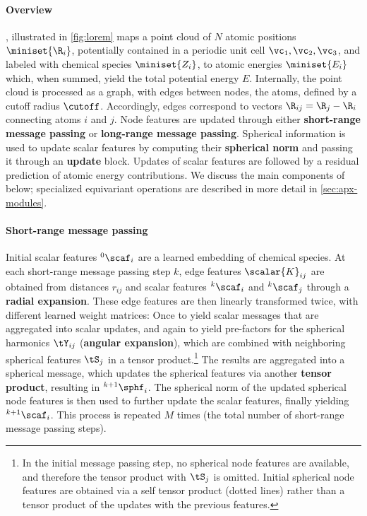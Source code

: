 \documentclass[10pt]{article}
\begin{document}
\paragraph{Overview} \lorem, illustrated in \cref{fig:lorem} maps a point cloud of $N$ atomic positions $\miniset{\R_i}$, potentially contained in a periodic unit cell $\vc_1,\vc_2,\vc_3$, and labeled with chemical species $\miniset{Z_i}$, to atomic energies $\miniset{E_i}$ which, when summed, yield the total potential energy $E$. Internally, the point cloud is processed as a graph, with edges between nodes, the atoms, defined by a cutoff radius $\cutoff$. Accordingly, edges correspond to vectors $\R_{ij}=\R_j-\R_i$ connecting atoms $i$ and $j$. Node features are updated through either {\bf short-range message passing} or {\bf long-range message passing}. Spherical information is used to update scalar features by computing their {\bf spherical norm} and passing it through an {\bf update} block. Updates of scalar features are followed by a residual prediction of atomic energy contributions.
We discuss the main components of \lorem below; specialized equivariant operations are described in more detail in \cref{sec:apx-modules}.


\paragraph{Short-range message passing}
Initial scalar features ${}^0\scaf_i$ are a learned embedding of chemical species.
At each short-range message passing step $k$, edge features $\scalar{K}_{ij}$ are obtained from distances $r_{ij}$ and scalar features ${}^k\scaf_i$ and ${}^k\scaf_j$ through a {\bf radial expansion}.
These edge features are then linearly transformed twice, with different learned weight matrices: Once to yield scalar messages that are aggregated into scalar updates, and again to yield pre-factors for the spherical harmonics $\tY_{ij}$ ({\bf angular expansion}), which are combined with neighboring spherical features $\tS_j$ in a tensor product.\footnote{In the initial message passing step, no spherical node features are available, and therefore the tensor product with $\tS_j$ is omitted. Initial spherical node features are obtained via a self tensor product (dotted lines) rather than a tensor product of the updates with the previous features.}
The results are aggregated into a spherical message, which updates the spherical features via another {\bf tensor product}, resulting in ${}^{k+1}\sphf_i$.
The spherical norm of the updated spherical node features is then used to further update the scalar features, finally yielding  ${}^{k+1}\scaf_i$.
This process is repeated $M$ times (the total number of short-range message passing steps). 
\end{document}
